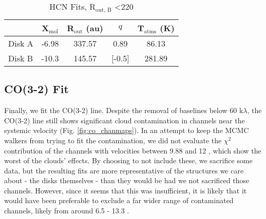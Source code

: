 \begin{table}
  \centering
  \begin{threeparttable}
    \caption{HCN Fits, R$_\text{out, B}$ \textless 220}
    \label{table:hcn_short_rout}
    \renewcommand{\arraystretch}{1.2}
    \begin{tabular}{l c c c c }
      \toprule \toprule
                & X$_\text{mol}$ & R$_\text{out}$ (au)     & $q$    & T$_\text{atms}$ (K) \\
      \midrule %
        Disk A  & -6.98          & 337.57             & 0.89   & 86.13 \\
        Disk B  & -10.3          & 145.57             & [-0.5] & 281.89 \\
      \bottomrule
    \end{tabular}
  \end{threeparttable}
\end{table}




\subsection{CO(3-2) Fit}
\label{subsection:co_fit}
Finally, we fit the CO(3-2) line. Despite the removal of baselines below 60 k$\lambda$, the CO(3-2) line still shows significant cloud contamination in channels near the systemic velocity (Fig. \ref{fig:co_chanmaps}). In an attempt to keep the MCMC walkers from trying to fit the contamination, we did not evaluate the $\chi^2$ contribution of the channels with velocities between 9.88 and 12 \kms, which show the worst of the clouds' effects. By choosing to not include these, we sacrifice some data, but the resulting fits are more representative of the structures we care about - the disks themselves - than they would be had we not sacrificed those channels. However, since it seems that this was insufficient, it is likely that it would have been preferable to exclude a far wider range of contaminated channels, likely from around 6.5 - 13.3 \kms.


